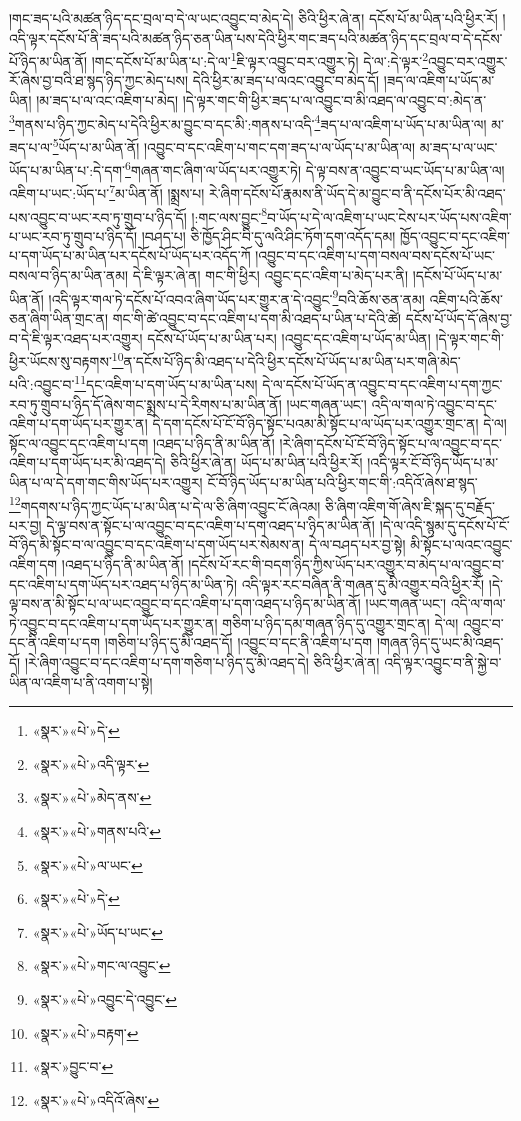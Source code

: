 །གང་ཟད་པའི་མཚན་ཉིད་དང་བྲལ་བ་དེ་ལ་ཡང་འབྱུང་བ་མེད་དེ། ཅིའི་ཕྱིར་ཞེ་ན། དངོས་པོ་མ་ཡིན་པའི་ཕྱིར་རོ། །འདི་ལྟར་དངོས་པོ་ནི་ཟད་པའི་མཚན་ཉིད་ཅན་ཡིན་པས་དེའི་ཕྱིར་གང་ཟད་པའི་མཚན་ཉིད་དང་བྲལ་བ་དེ་དངོས་པོ་ཉིད་མ་ཡིན་ནོ། །གང་དངོས་པོ་མ་ཡིན་པ་:དེ་ལ་\footnote{«སྣར་»«པེ་»དེ་}ཇི་ལྟར་འབྱུང་བར་འགྱུར་ཏེ། དེ་ལ་:དེ་ལྟར་\footnote{«སྣར་»«པེ་»འདི་ལྟར་}འབྱུང་བར་འགྱུར་རོ་ཞེས་བྱ་བའི་ཐ་སྙད་ཉིད་ཀྱང་མེད་པས། དེའི་ཕྱིར་མ་ཟད་པ་ལའང་འབྱུང་བ་མེད་དོ། །ཟད་ལ་འཇིག་པ་ཡོད་མ་ཡིན། །མ་ཟད་པ་ལ་འང་འཇིག་པ་མེད། །དེ་ལྟར་གང་གི་ཕྱིར་ཟད་པ་ལ་འབྱུང་བ་མི་འཐད་ལ་འབྱུང་བ་:མེད་ན་\footnote{«སྣར་»«པེ་»མེད་ནས་}གནས་པ་ཉིད་ཀྱང་མེད་པ་དེའི་ཕྱིར་མ་བྱུང་བ་དང་མི་:གནས་པ་འདི་\footnote{«སྣར་»«པེ་»གནས་པའི་}ཟད་པ་ལ་འཇིག་པ་ཡོད་པ་མ་ཡིན་ལ། མ་ཟད་པ་ལ་\footnote{«སྣར་»«པེ་»ལ་ཡང་}ཡོད་པ་མ་ཡིན་ནོ། །འབྱུང་བ་དང་འཇིག་པ་གང་དག་ཟད་པ་ལ་ཡོད་པ་མ་ཡིན་ལ། མ་ཟད་པ་ལ་ཡང་ཡོད་པ་མ་ཡིན་པ་:དེ་དག་\footnote{«སྣར་»«པེ་»དེ་}གཞན་གང་ཞིག་ལ་ཡོད་པར་འགྱུར་ཏེ། དེ་ལྟ་བས་ན་འབྱུང་བ་ཡང་ཡོད་པ་མ་ཡིན་ལ། འཇིག་པ་ཡང་:ཡོད་པ་\footnote{«སྣར་»«པེ་»ཡོད་པ་ཡང་}མ་ཡིན་ནོ། །སྨྲས་པ། རེ་ཞིག་དངོས་པོ་རྣམས་ནི་ཡོད་དེ་མ་བྱུང་བ་ནི་དངོས་པོར་མི་འཐད་པས་འབྱུང་བ་ཡང་རབ་ཏུ་གྲུབ་པ་ཉིད་དོ། །:གང་ལས་བྱུང་\footnote{«སྣར་»«པེ་»གང་ལ་འབྱུང་}བ་ཡོད་པ་དེ་ལ་འཇིག་པ་ཡང་ངེས་པར་ཡོད་པས་འཇིག་པ་ཡང་རབ་ཏུ་གྲུབ་པ་ཉིད་དོ། །བཤད་པ། ཅི་ཁྱོད་ཤིང་བི་དུ་ལའི་ཤིང་ཏོག་དག་འདོད་དམ། ཁྱོད་འབྱུང་བ་དང་འཇིག་པ་དག་ཡོད་པ་མ་ཡིན་པར་དངོས་པོ་ཡོད་པར་འདོད་ཀོ །འབྱུང་བ་དང་འཇིག་པ་དག་བསལ་བས་དངོས་པོ་ཡང་བསལ་བ་ཉིད་མ་ཡིན་ནམ། དེ་ཇི་ལྟར་ཞེ་ན། གང་གི་ཕྱིར། འབྱུང་དང་འཇིག་པ་མེད་པར་ནི། །དངོས་པོ་ཡོད་པ་མ་ཡིན་ནོ། །འདི་ལྟར་གལ་ཏེ་དངོས་པོ་འབའ་ཞིག་ཡོད་པར་གྱུར་ན་དེ་འབྱུང་\footnote{«སྣར་»«པེ་»འབྱུང་དེ་འབྱུང་}བའི་ཆོས་ཅན་ནམ། འཇིག་པའི་ཆོས་ཅན་ཞིག་ཡིན་གྲང་ན། གང་གི་ཚེ་འབྱུང་བ་དང་འཇིག་པ་དག་མི་འཐད་པ་ཡིན་པ་དེའི་ཚེ། དངོས་པོ་ཡོད་དོ་ཞེས་བྱ་བ་དེ་ཇི་ལྟར་འཐད་པར་འགྱུར། དངོས་པོ་ཡོད་པ་མ་ཡིན་པར། །འབྱུང་དང་འཇིག་པ་ཡོད་མ་ཡིན། །དེ་ལྟར་གང་གི་ཕྱིར་ཡོངས་སུ་བརྟགས་\footnote{«སྣར་»«པེ་»བརྟག་}ན་དངོས་པོ་ཉིད་མི་འཐད་པ་དེའི་ཕྱིར་དངོས་པོ་ཡོད་པ་མ་ཡིན་པར་གཞི་མེད་པའི་:འབྱུང་བ་\footnote{«སྣར་»བྱུང་བ་}དང་འཇིག་པ་དག་ཡོད་པ་མ་ཡིན་པས། དེ་ལ་དངོས་པོ་ཡོད་ན་འབྱུང་བ་དང་འཇིག་པ་དག་ཀྱང་རབ་ཏུ་གྲུབ་པ་ཉིད་དོ་ཞེས་གང་སྨྲས་པ་དེ་རིགས་པ་མ་ཡིན་ནོ། །ཡང་གཞན་ཡང་། འདི་ལ་གལ་ཏེ་འབྱུང་བ་དང་འཇིག་པ་དག་ཡོད་པར་གྱུར་ན། དེ་དག་དངོས་པོ་ངོ་བོ་ཉིད་སྟོང་པའམ་མི་སྟོང་པ་ལ་ཡོད་པར་འགྱུར་གྲང་ན། དེ་ལ། སྟོང་ལ་འབྱུང་དང་འཇིག་པ་དག །འཐད་པ་ཉིད་ནི་མ་ཡིན་ནོ། །རེ་ཞིག་དངོས་པོ་ངོ་བོ་ཉིད་སྟོང་པ་ལ་འབྱུང་བ་དང་འཇིག་པ་དག་ཡོད་པར་མི་འཐད་དེ། ཅིའི་ཕྱིར་ཞེ་ན། ཡོད་པ་མ་ཡིན་པའི་ཕྱིར་རོ། །འདི་ལྟར་ངོ་བོ་ཉིད་ཡོད་པ་མ་ཡིན་པ་ལ་དེ་དག་གང་གིས་ཡོད་པར་འགྱུར། ངོ་བོ་ཉིད་ཡོད་པ་མ་ཡིན་པའི་ཕྱིར་གང་གི་:འདིའོ་ཞེས་ཐ་སྙད་\footnote{«སྣར་»«པེ་»འདིའོ་ཞེས་}གདགས་པ་ཉིད་ཀྱང་ཡོད་པ་མ་ཡིན་པ་དེ་ལ་ཅི་ཞིག་འབྱུང་ངོ་ཞེའམ། ཅི་ཞིག་འཇིག་གོ་ཞེས་ཇི་སྐད་དུ་བརྗོད་པར་བྱ། དེ་ལྟ་བས་ན་སྟོང་པ་ལ་འབྱུང་བ་དང་འཇིག་པ་དག་འཐད་པ་ཉིད་མ་ཡིན་ནོ། །དེ་ལ་འདི་སྙམ་དུ་དངོས་པོ་ངོ་བོ་ཉིད་མི་སྟོང་བ་ལ་འབྱུང་བ་དང་འཇིག་པ་དག་ཡོད་པར་སེམས་ན། དེ་ལ་བཤད་པར་བྱ་སྟེ། མི་སྟོང་པ་ལའང་འབྱུང་འཇིག་དག །འཐད་པ་ཉིད་ནི་མ་ཡིན་ནོ། །དངོས་པོ་རང་གི་བདག་ཉིད་ཀྱིས་ཡོད་པར་འགྱུར་བ་མེད་པ་ལ་འབྱུང་བ་དང་འཇིག་པ་དག་ཡོད་པར་འཐད་པ་ཉིད་མ་ཡིན་ཏེ། འདི་ལྟར་རང་བཞིན་ནི་གཞན་དུ་མི་འགྱུར་བའི་ཕྱིར་རོ། །དེ་ལྟ་བས་ན་མི་སྟོང་པ་ལ་ཡང་འབྱུང་བ་དང་འཇིག་པ་དག་འཐད་པ་ཉིད་མ་ཡིན་ནོ། །ཡང་གཞན་ཡང་། འདི་ལ་གལ་ཏེ་འབྱུང་བ་དང་འཇིག་པ་དག་ཡོད་པར་གྱུར་ན། གཅིག་པ་ཉིད་དམ་གཞན་ཉིད་དུ་འགྱུར་གྲང་ན། དེ་ལ། འབྱུང་བ་དང་ནི་འཇིག་པ་དག །གཅིག་པ་ཉིད་དུ་མི་འཐད་དོ། །འབྱུང་བ་དང་ནི་འཇིག་པ་དག །གཞན་ཉིད་དུ་ཡང་མི་འཐད་དོ། །རེ་ཞིག་འབྱུང་བ་དང་འཇིག་པ་དག་གཅིག་པ་ཉིད་དུ་མི་འཐད་དེ། ཅིའི་ཕྱིར་ཞེ་ན། འདི་ལྟར་འབྱུང་བ་ནི་སྐྱེ་བ་ཡིན་ལ་འཇིག་པ་ནི་འགག་པ་སྟེ། 